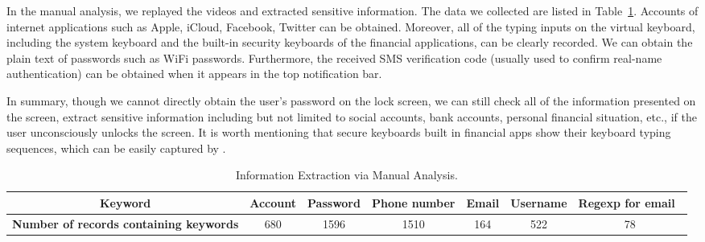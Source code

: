 In the manual analysis, we replayed the videos and extracted sensitive information.
The data we collected are listed in Table~\ref{table:information_extracted}.
Accounts of internet applications such as Apple, iCloud, Facebook, Twitter can be obtained.
Moreover, all of the typing inputs on the virtual keyboard, including the system keyboard and the built-in security keyboards of the financial applications, can be clearly recorded.
We can obtain the plain text of passwords such as WiFi passwords.
Furthermore, the received SMS verification code (usually used to confirm real-name authentication) can be obtained when it appears in the top notification bar.

In summary, though we cannot directly obtain the user's password on the lock screen, we can still check all of the information presented on the screen, extract sensitive information including but not limited to social accounts, bank accounts, personal financial situation, etc., if the user unconsciously unlocks the screen.
It is worth mentioning that {secure keyboards} built in financial apps show their keyboard typing sequences, which can be easily captured by \tool.

\begin{table}[t]
	\centering
	\begin{tabular}{|c|c|c|c|c|c|c|} 
		\hline
		\textbf{Keyword}                               & Account & Password & Phone number & Email & Username & Regexp for email~  \\ 
		\hline
		\textbf{Number of records containing keywords} & 680     & 1596     & 1510         & 164   & 522      & 78                 \\
		\hline
	\end{tabular}
	\linebreak
	\caption{Information Extraction via Manual Analysis.}
	\label{table:information_extracted}
\end{table}

